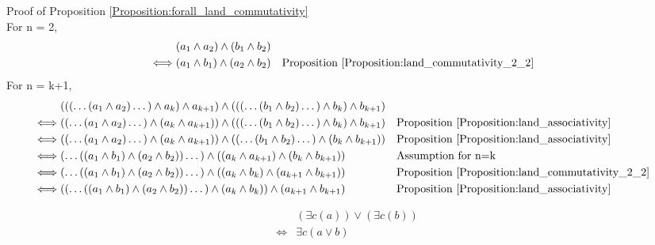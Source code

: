 Proof of Proposition \ref{Proposition:forall_land_commutativity} \\
For n = 2,
\begin{align*}
& (a_1 \land a_2) \land (b_1 \land b_2) \\
\iff & (a_1 \land b_1) \land (a_2 \land b_2)
& & \text{Proposition \ref{Proposition:land_commutativity_2_2}} \\
\end{align*}
For n = k+1,
\begin{align*}
& ((( \dots (a_1 \land a_2) \dots ) \land a_k) \land a_{k+1}) \land ((( \dots (b_1 \land b_2) \dots ) \land b_k ) \land b_{k+1}) \\
\iff & (( \dots (a_1 \land a_2) \dots ) \land (a_k \land a_{k+1})) \land ((( \dots (b_1 \land b_2) \dots ) \land b_k ) \land b_{k+1})
& & \text{Proposition \ref{Proposition:land_associativity}} \\
\iff & (( \dots (a_1 \land a_2) \dots ) \land (a_k \land a_{k+1})) \land (( \dots (b_1 \land b_2) \dots ) \land (b_k \land b_{k+1}))
& & \text{Proposition \ref{Proposition:land_associativity}} \\
\iff & ( \dots ((a_1 \land b_1) \land (a_2 \land b_2)) \dots ) \land ((a_k \land a_{k+1}) \land (b_k \land b_{k+1}))
& & \text{Assumption for n=k} \\
\iff & ( \dots ((a_1 \land b_1) \land (a_2 \land b_2)) \dots ) \land ((a_k \land b_k) \land (a_{k+1} \land b_{k+1}))
& & \text{Proposition \ref{Proposition:land_commutativity_2_2}} \\
\iff & (( \dots ((a_1 \land b_1) \land (a_2 \land b_2)) \dots ) \land (a_k \land b_k)) \land (a_{k+1} \land b_{k+1})
& & \text{Proposition \ref{Proposition:land_associativity}} \\
\end{align*}

\begin{prop}
\label{Proposition:exists_lor_commutativity}
\begin{align*}
& (\exists c (a)) \lor (\exists c (b)) \\
\iff & \exists c (a \lor b)
\end{align*}
\end{prop}

